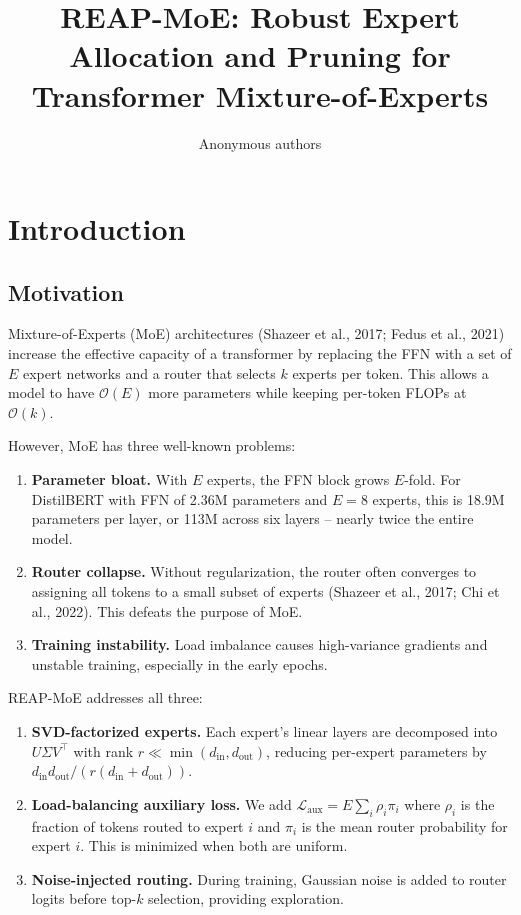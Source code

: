 \title{\textbf{REAP-MoE: Robust Expert Allocation and Pruning for Transformer Mixture-of-Experts}}

\author{Anonymous authors}


\section{Introduction}

\subsection{Motivation}

Mixture-of-Experts (MoE) architectures (Shazeer et al., 2017; Fedus et al., 
2021) increase the effective capacity of a transformer by replacing the 
FFN with a set of $E$ expert networks and a router that selects $k$ experts 
per token. This allows a model to have $\mathcal{O}(E)$ more parameters while 
keeping per-token FLOPs at $\mathcal{O}(k)$.

However, MoE has three well-known problems:

\begin{enumerate}
\item \textbf{Parameter bloat.} With $E$ experts, the FFN block grows $E$-fold. For
  DistilBERT with FFN of 2.36M parameters and $E = 8$ experts, this is 18.9M
  parameters per layer, or 113M across six layers -- nearly twice the entire
  model.

\item \textbf{Router collapse.} Without regularization, the router often converges
  to assigning all tokens to a small subset of experts (Shazeer et al., 2017;
  Chi et al., 2022). This defeats the purpose of MoE.

\item \textbf{Training instability.} Load imbalance causes high-variance gradients
  and unstable training, especially in the early epochs.

\end{enumerate}
REAP-MoE addresses all three:

\begin{enumerate}
\item \textbf{SVD-factorized experts.} Each expert's linear layers are decomposed
  into $U \Sigma V^\top$ with rank $r \ll \min(d_\text{in}, d_\text{out})$,
  reducing per-expert parameters by $d_\text{in} d_\text{out} / (r(d_\text{in} + d_\text{out}))$.

\item \textbf{Load-balancing auxiliary loss.} We add $\mathcal{L}_\text{aux} = E \sum_i \rho_i \pi_i$
  where $\rho_i$ is the fraction of tokens routed to expert $i$ and $\pi_i$ is
  the mean router probability for expert $i$. This is minimized when both
  are uniform.

\item \textbf{Noise-injected routing.} During training, Gaussian noise is added to
  router logits before top-$k$ selection, providing exploration.

\end{enumerate}
